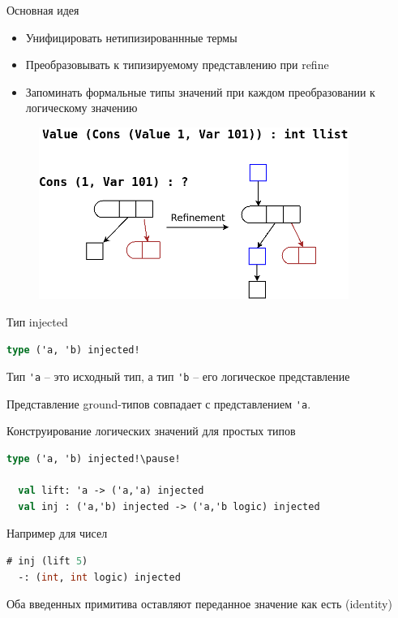 \documentclass[10pt, mathserif]{beamer}
\theoremstyle{definition}
\begin{document}
\begin{frame}[fragile]{Основная идея}
\begin{itemize}
 \item Унифицировать нетипизированнные термы
 \item Преобразовывать к типизируемому представлению при refine
 \item Запоминать формальные типы значений при каждом преобразовании к логическому значению
\end{itemize}

\begin{figure}
\centering
\includegraphics[width=0.9\textwidth]{img5.png}
\end{figure}
\end{frame}

\begin{frame}[fragile]{Тип injected}
  \begin{lstlisting}[language=ml]
  type ('a, 'b) injected!
  \end{lstlisting}

\vskip 1cm
  Тип \verb='a= -- это исходный тип, а тип \verb='b= -- его логическое представление
  
  Представление ground-типов совпадает с представлением \verb='a=.
\end{frame}

\begin{frame}[fragile]{Конструирование логических значений для простых типов}
  \begin{lstlisting}[language=ml]
  type ('a, 'b) injected!\pause!

  val lift: 'a -> ('a,'a) injected
  val inj : ('a,'b) injected -> ('a,'b logic) injected
  \end{lstlisting}
  \pause
  Например для чисел
  \begin{lstlisting}[language=ml]
  # inj (lift 5)
  -: (int, int logic) injected
  \end{lstlisting}
  \pause
  Оба введенных примитива оставляют переданное значение как есть (identity)
\end{frame}
\end{document}
